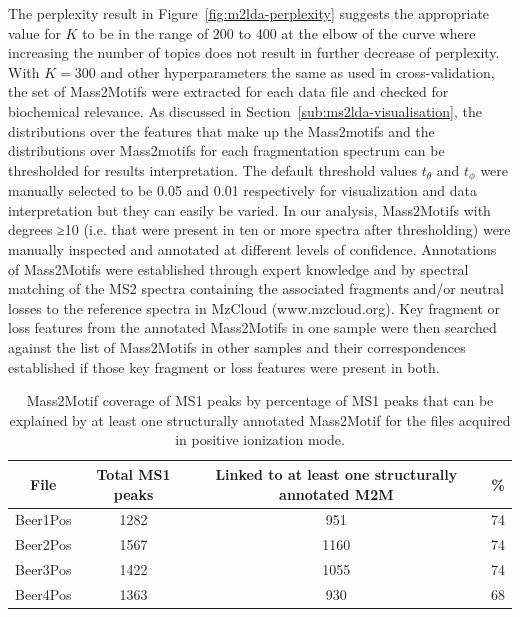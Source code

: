 The perplexity result in Figure~\ref{fig:m2lda-perplexity} suggests the appropriate value for $K$ to be in the range of 200 to 400 at the elbow of the curve where increasing the number of topics does not result in further decrease of perplexity. With $K=300$ and other hyperparameters the same as used in cross-validation, the set of Mass2Motifs were extracted for each data file and checked for biochemical relevance. As discussed in Section~\ref{sub:ms2lda-visualisation}, the distributions over the features that make up the Mass2motifs and the distributions over Mass2motifs for each fragmentation spectrum can be thresholded for results interpretation. The default threshold values $t_{\theta}$ and $t_{\phi}$ were manually selected to be 0.05 and 0.01 respectively for visualization and data interpretation but they can easily be varied. In our analysis, Mass2Motifs with degrees ≥10 (i.e. that were present in ten or more spectra after thresholding) were manually inspected and annotated at different levels of confidence. Annotations of Mass2Motifs were established through expert knowledge and by spectral matching of the MS2 spectra containing the associated fragments and/or neutral losses to the reference spectra in MzCloud (www.mzcloud.org). Key fragment or loss features from the annotated Mass2Motifs in one sample were then searched against the list of Mass2Motifs in other samples and their correspondences established if those key fragment or loss features were present in both.

\begin{table}
\begin{centering}
\begin{tabular}{|c|c|c|c|}
\hline 
File & Total MS1 peaks & Linked to at least one structurally annotated M2M & \%\tabularnewline
\hline 
\hline 
Beer1Pos & 1282 & 951 & 74\tabularnewline
\hline 
Beer2Pos & 1567 & 1160 & 74\tabularnewline
\hline 
Beer3Pos & 1422 & 1055 & 74\tabularnewline
\hline 
Beer4Pos & 1363 & 930 & 68\tabularnewline
\hline 
\end{tabular}
\par\end{centering}
\caption{Mass2Motif coverage of MS1 peaks by percentage of MS1 peaks that can
be explained by at least one structurally annotated Mass2Motif for
the files acquired in positive ionization mode.\label{tab:ms2lda-coverage}}
\end{table}

